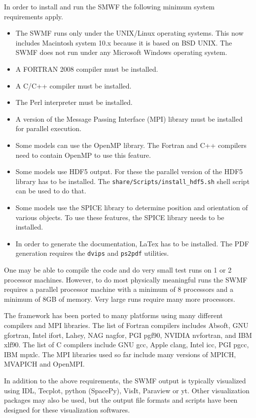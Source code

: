 In order to install and run the SMWF the following minimum system
requirements apply.
\begin{itemize}
\item The SWMF runs only under the UNIX/Linux operating systems.  This now
  includes Macintosh system 10.x because it is based on BSD UNIX.  The
  SWMF does not run under any Microsoft Windows operating system.
\item A FORTRAN 2008 compiler must be installed.
\item A C/C++ compiler must be installed.
\item The Perl interpreter must be installed.
\item A version of the Message Passing Interface (MPI) library must be
  installed for parallel execution.
\item Some models can use the OpenMP library. The Fortran and C++ compilers
  need to contain OpenMP to use this feature.
\item Some models use HDF5 output. For these the parallel version of 
  the HDF5 library has to be installed. The {\tt share/Scripts/install\_hdf5.sh}
  shell script can be used to do that.
\item Some models use the SPICE library to determine position and 
  orientation of various objects. To use these features, the SPICE
  library needs to be installed.
\item In order to generate the documentation, LaTex has to be installed.
  The PDF generation requires the {\tt dvips} and {\tt ps2pdf}
  utilities. 
\end{itemize}
One may be able to compile the code and do very small test
runs on 1 or 2 processor machines.  However, to do most physically
meaningful runs the SWMF requires a parallel processor machine with a 
minimum of 8 processors and a minimum of 8GB of memory.
Very large runs require many more processors.

The framework has been ported to many platforms using many different
compilers and MPI libraries. The list of Fortran compilers includes
Absoft, GNU gfortran, Intel ifort, Lahey, NAG nagfor, PGI pgf90, NVIDIA nvfortran, and IBM xlf90.
The list of C compilers include GNU gcc, Apple clang, Intel icc, PGI pgcc, IBM mpxlc.
The MPI libraries used so far include many versions of MPICH, MVAPICH and 
OpenMPI. 

In addition to the above requirements, the SWMF output is typically
visualized using IDL, Tecplot, python (SpacePy), VisIt, Paraview or yt.
Other visualization packages may also be used, but the output file
formats and scripts have been designed for these visualization softwares.


